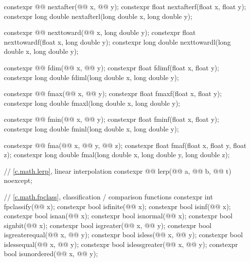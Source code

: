 \begin{codeblock}
{  constexpr @@ nextafter(@@ x, @@ y);
  constexpr float nextafterf(float x, float y);
  constexpr long double nextafterl(long double x, long double y);

  constexpr @@ nexttoward(@@ x, long double y);
  constexpr float nexttowardf(float x, long double y);
  constexpr long double nexttowardl(long double x, long double y);

  constexpr @@ fdim(@@ x, @@ y);
  constexpr float fdimf(float x, float y);
  constexpr long double fdiml(long double x, long double y);

  constexpr @@ fmax(@@ x, @@ y);
  constexpr float fmaxf(float x, float y);
  constexpr long double fmaxl(long double x, long double y);

  constexpr @@ fmin(@@ x, @@ y);
  constexpr float fminf(float x, float y);
  constexpr long double fminl(long double x, long double y);

  constexpr @@ fma(@@ x, @@ y,
                                    @@ z);
  constexpr float fmaf(float x, float y, float z);
  constexpr long double fmal(long double x, long double y, long double z);

  // \ref{c.math.lerp}, linear interpolation
  constexpr @@ lerp(@@ a, @@ b,
                                     @@ t) noexcept;

  // \ref{c.math.fpclass}, classification / comparison functions
  constexpr int fpclassify(@@ x);
  constexpr bool isfinite(@@ x);
  constexpr bool isinf(@@ x);
  constexpr bool isnan(@@ x);
  constexpr bool isnormal(@@ x);
  constexpr bool signbit(@@ x);
  constexpr bool isgreater(@@ x, @@ y);
  constexpr bool isgreaterequal(@@ x, @@ y);
  constexpr bool isless(@@ x, @@ y);
  constexpr bool islessequal(@@ x, @@ y);
  constexpr bool islessgreater(@@ x, @@ y);
  constexpr bool isunordered(@@ x, @@ y);

}
\end{codeblock}
